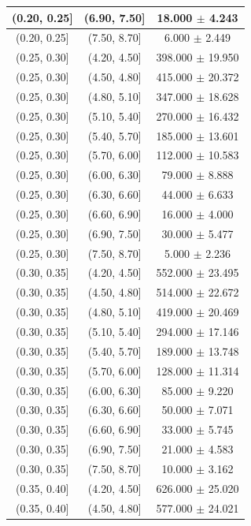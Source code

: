 \begin{longtable}{|c|c|c|}
\hline
(0.20, 0.25] & (6.90, 7.50] & 18.000 $\pm$ 4.243 \\ 
\hline
(0.20, 0.25] & (7.50, 8.70] & 6.000 $\pm$ 2.449 \\ 
\hline
(0.25, 0.30] & (4.20, 4.50] & 398.000 $\pm$ 19.950 \\ 
\hline
(0.25, 0.30] & (4.50, 4.80] & 415.000 $\pm$ 20.372 \\ 
\hline
(0.25, 0.30] & (4.80, 5.10] & 347.000 $\pm$ 18.628 \\ 
\hline
(0.25, 0.30] & (5.10, 5.40] & 270.000 $\pm$ 16.432 \\ 
\hline
(0.25, 0.30] & (5.40, 5.70] & 185.000 $\pm$ 13.601 \\ 
\hline
(0.25, 0.30] & (5.70, 6.00] & 112.000 $\pm$ 10.583 \\ 
\hline
(0.25, 0.30] & (6.00, 6.30] & 79.000 $\pm$ 8.888 \\ 
\hline
(0.25, 0.30] & (6.30, 6.60] & 44.000 $\pm$ 6.633 \\ 
\hline
(0.25, 0.30] & (6.60, 6.90] & 16.000 $\pm$ 4.000 \\ 
\hline
(0.25, 0.30] & (6.90, 7.50] & 30.000 $\pm$ 5.477 \\ 
\hline
(0.25, 0.30] & (7.50, 8.70] & 5.000 $\pm$ 2.236 \\ 
\hline
(0.30, 0.35] & (4.20, 4.50] & 552.000 $\pm$ 23.495 \\ 
\hline
(0.30, 0.35] & (4.50, 4.80] & 514.000 $\pm$ 22.672 \\ 
\hline
(0.30, 0.35] & (4.80, 5.10] & 419.000 $\pm$ 20.469 \\ 
\hline
(0.30, 0.35] & (5.10, 5.40] & 294.000 $\pm$ 17.146 \\ 
\hline
(0.30, 0.35] & (5.40, 5.70] & 189.000 $\pm$ 13.748 \\ 
\hline
(0.30, 0.35] & (5.70, 6.00] & 128.000 $\pm$ 11.314 \\ 
\hline
(0.30, 0.35] & (6.00, 6.30] & 85.000 $\pm$ 9.220 \\ 
\hline
(0.30, 0.35] & (6.30, 6.60] & 50.000 $\pm$ 7.071 \\ 
\hline
(0.30, 0.35] & (6.60, 6.90] & 33.000 $\pm$ 5.745 \\ 
\hline
(0.30, 0.35] & (6.90, 7.50] & 21.000 $\pm$ 4.583 \\ 
\hline
(0.30, 0.35] & (7.50, 8.70] & 10.000 $\pm$ 3.162 \\ 
\hline
(0.35, 0.40] & (4.20, 4.50] & 626.000 $\pm$ 25.020 \\ 
\hline
(0.35, 0.40] & (4.50, 4.80] & 577.000 $\pm$ 24.021 \\ 

\end{longtable}
